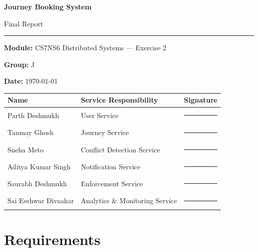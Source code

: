 \documentclass[12pt,a4paper]{article}
\begin{document}
\begin{titlepage}
  \centering
  \vspace*{2cm}
  {\LARGE\bfseries Journey Booking System\par}
  \vspace{0.4cm}
  {\Large Final Report\par}
  \vspace{1.5cm}
  \rule{0.6\textwidth}{0.4pt}\par
  \vspace{0.8cm}
  {\large\textbf{Module:} CS7NS6 Distributed Systems --- Exercise 2\par}
  \vspace{0.3cm}
  {\large\textbf{Group:} J\par}
  \vspace{0.3cm}
  {\large\textbf{Date:} \today\par}
  \vspace{2cm}

  \begin{tabular}{l l l}
    \toprule
    \textbf{Name} & \textbf{Service Responsibility} & \textbf{Signature} \\
    \midrule
    Parth Deshmukh        & User Service                  & \rule{3cm}{0.4pt} \\[0.4cm]
    Tanmay Ghosh          & Journey Service               & \rule{3cm}{0.4pt} \\[0.4cm]
    Sneha Meto            & Conflict Detection Service    & \rule{3cm}{0.4pt} \\[0.4cm]
    Aditya Kumar Singh    & Notification Service          & \rule{3cm}{0.4pt} \\[0.4cm]
    Saurabh Deshmukh      & Enforcement Service           & \rule{3cm}{0.4pt} \\[0.4cm]
    Sai Eeshwar Divaakar  & Analytics \& Monitoring Service & \rule{3cm}{0.4pt} \\[0.4cm]
    \bottomrule
  \end{tabular}
\end{titlepage}

\tableofcontents
\newpage

\section{Requirements}
\end{document}
